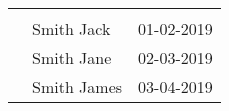 \documentclass[crop, tikz, dvipsnames]{standalone}
\begin{document}
\sloppy
    \begin{tabular}{lll}
        & & \\
        & \colorbox{BurntOrange}{Smith Ja}ck & 01-02-2019 \\
        & \colorbox{BurntOrange}{Smith Ja}ne & 02-03-2019 \\
        & \colorbox{BurntOrange}{Smith Ja}mes & 03-04-2019 \\
    \end{tabular}
\end{document}
